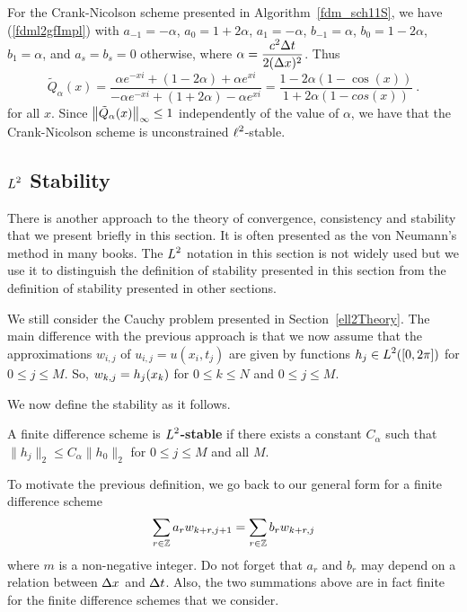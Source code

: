 \begin{egg}
For the Crank-Nicolson scheme presented in
Algorithm~\ref{fdm_sch11S}, we have (\ref{fdml2gfImpl}) with
$a_{-1} = -\alpha$, $a_0 = 1 + 2\alpha$, $a_1 = -\alpha$,
$b_{-1} = \alpha$, $b_0 = 1 - 2\alpha$, $b_1 = \alpha$,
and $a_s = b_s = 0$ otherwise, where
$\displaystyle \alpha = \frac{c^2\Delta{t}}{2 (\Delta{x})^2}$.
Thus
\[
\tilde{Q}_\alpha(x) =
\frac{\alpha e^{-xi} +(1-2\alpha) + \alpha e^{xi}}
{-\alpha e^{-xi} + (1+2\alpha) - \alpha e^{xi}}
= \frac{1 - 2\alpha(1 -\cos(x))}{1+2\alpha(1-cos(x))} \ .
\]
for all $x$.  Since
$\displaystyle \left\|\tilde{Q}_\alpha(x)\right\|_\infty \leq 1$
independently of the value of $\alpha$, we have that the
Crank-Nicolson scheme is unconstrained $\displaystyle \ell^2$-stable.
\label{CNell2StableNo2}
\end{egg}

\subsection{$\displaystyle L^2$ Stability}\label{L2Stab}

There is another approach to the theory of convergence, consistency
and stability that we present briefly in this section.  It is
often presented as the von Neumann's method in many books.  The
$\displaystyle L^2$ notation in this section is not widely used but we
use it to distinguish the definition of stability presented in this
section from the definition of stability presented in other sections.

We still consider the Cauchy problem presented in Section~\ref{ell2Theory}.
The main difference with the previous approach is that we now assume
that the approximations $w_{i,j}$ of $u_{i,j} = u(x_i,t_j)$ are given
by functions $\displaystyle h_j \in L^2([0,2\pi])$ for $0 \leq j \leq M$.
So, $\displaystyle w_{k,j} = h_j(x_k)$ for $0 \leq k \leq N$ and
$0\leq j \leq M$.

We now define the stability as it follows.

\begin{defn} \label{fdmStableDefNo3}
A finite difference scheme is
{\bfseries $\displaystyle L^2$-stable} if there exists a
constant $C_\alpha$ such that $\|h_j\|_2 \leq C_\alpha \|h_0\|_2$ for
$0 \leq j \leq M$ and all $M$.
\end{defn}

To motivate the previous definition, we go back to our general form
for a finite difference scheme
\begin{equation} \label{fdmgfL2A}
\sum_{r\in \mathbb{Z}} a_r w_{k+r,j+1} =
\sum_{r\in \mathbb{Z}} b_r w_{k+r,j}
\end{equation}
where $m$ is a non-negative integer.  Do not forget that $a_r$ and
$b_r$ may depend on a relation between $\Delta{x}$ and $\Delta{t}$.
Also, the two summations above are in fact finite for the finite
difference schemes that we consider.

